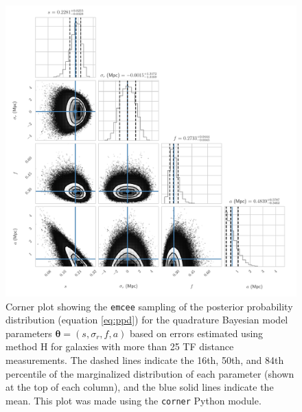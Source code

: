 \documentclass[a4paper,fleqn,usenatbib]{mnras}
\begin{document}
\begin{figure}
	\includegraphics[scale=0.69]{f10cornerq}
    \caption{Corner plot showing the \texttt{emcee} sampling of the posterior probability distribution (equation \ref{eq:ppd}) for the quadrature Bayesian model parameters $\pmb{\theta}=(s,\sigma_r,f,a)$ based on errors estimated using method H for galaxies with more than 25 TF distance measurements. The dashed lines indicate the 16th, 50th, and 84th percentile of the marginalized distribution of each parameter (shown at the top of each column), and the blue solid lines indicate the mean. This plot was made using the \texttt{corner} Python module.}
    \label{fig:cornerq}
\end{figure}
\end{document}
